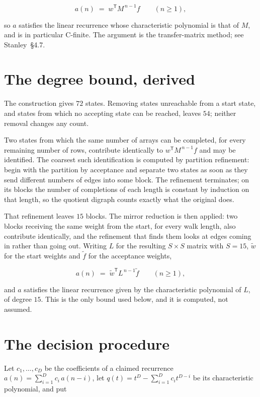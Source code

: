 \documentclass[11pt]{article}
\theoremstyle{definition}
\begin{document}
\[a(n) \;=\; w^{\mathsf T} M^{\,n-1} f \qquad (n \ge 1),\]

so $a$ satisfies the linear recurrence whose characteristic polynomial is that of $M$, and is in particular C-finite. The argument is the transfer-matrix method; see Stanley~\S4.7.

\section{The degree bound, derived}

The construction gives $72$ states. Removing states unreachable from a start state, and states from which no accepting state can be reached, leaves $54$; neither removal changes any count.

Two states from which the same number of arrays can be completed, for every remaining number of rows, contribute identically to $w^{\mathsf T}M^{\,n-1}f$ and may be identified. The coarsest such identification is computed by partition refinement: begin with the partition by acceptance and separate two states as soon as they send different numbers of edges into some block. The refinement terminates; on its blocks the number of completions of each length is constant by induction on that length, so the quotient digraph counts exactly what the original does.

That refinement leaves $15$ blocks. The mirror reduction is then applied: two blocks receiving the same weight from the start, for every walk length, also contribute identically, and the refinement that finds them looks at edges coming in rather than going out. Writing $L$ for the resulting $S \times S$ matrix with $S = 15$, $\tilde w$ for the start weights and $\tilde f$ for the acceptance weights,

\[a(n) \;=\; \tilde w^{\mathsf T} L^{\,n-1} \tilde f \qquad (n \ge 1),\]

and $a$ satisfies the linear recurrence given by the characteristic polynomial of $L$, of degree $15$. This is the only bound used below, and it is computed, not assumed.

\section{The decision procedure}

Let $c_1,\dots,c_D$ be the coefficients of a claimed recurrence $a(n) = \sum_{i=1}^{D} c_i\,a(n-i)$, let $q(t) = t^{D} - \sum_{i=1}^{D} c_i t^{D-i}$ be its characteristic polynomial, and put
\end{document}
